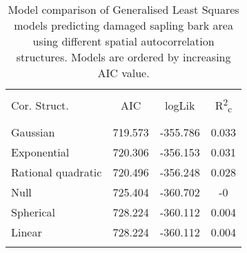 
\begin{table}[H] \centering 
  \caption{Model comparison of Generalised Least Squares models predicting damaged sapling bark area using different spatial autocorrelation structures. Models are ordered by increasing AIC value.} 
  \label{cor_table} 
\begin{tabular}{@{\extracolsep{5pt}} lS[table-format=3.2]S[table-format=3.2]S[table-format=3.2]} 
\\[-1.8ex]\hline 
\hline \\[-1.8ex] 
{Cor. Struct.} & {AIC} & {logLik} & {R\textsuperscript{2}\textsubscript{c}} \\
\hline \\[-1.8ex] 
Gaussian & 719.573 & -355.786 & 0.033 \\ 
Exponential & 720.306 & -356.153 & 0.031 \\ 
Rational quadratic & 720.496 & -356.248 & 0.028 \\ 
Null & 725.404 & -360.702 & -0 \\ 
Spherical & 728.224 & -360.112 & 0.004 \\ 
Linear & 728.224 & -360.112 & 0.004 \\ 
\hline \\[-1.8ex] 
\end{tabular} 
\end{table} 

